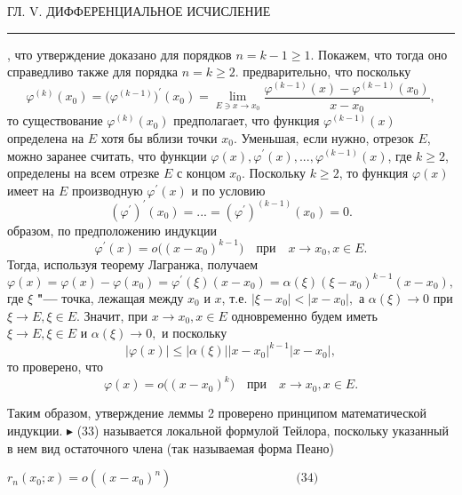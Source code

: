 \documentclass[a5paper, 16pt]{book}
\date{26.02.2023}
\author{Олег Концебалов}
\begin{document}
    \begin{center}
        \begin{spacing}
            ГЛ. V. ДИФФЕРЕНЦИАЛЬНОЕ ИСЧИСЛЕНИЕ
            \noindent\rule{\textwidth}{1pt}
		\end{spacing}
    \end{center}
    , что утверждение доказано для порядков $n = k - 1 \geq 1$. Покажем, что тогда оно справедливо также для порядка $n = k \geq 2$.
     предварительно, что поскольку 
    $$\varphi^{(k)} (x_0) = \bigg(\varphi^{(k - 1)}\bigg)^{'} (x_0) = \lim_{E \ni x\to x_0} \frac{\varphi^{(k - 1)} (x) - \varphi^{(k - 1)} (x_0)}{x - x_0} ,$$
    то существование $\varphi^{(k)} (x_0)$ предполагает, что функция $\varphi^{(k - 1)} (x)$ определена на $E$ хотя бы вблизи точки $x_0$. Уменьшая, если нужно, отрезок $E$, можно заранее считать, что функции $\varphi (x) , \varphi^{'} (x) , . . . , \varphi^{(k - 1)} (x)$, где $k \geq 2$, определены на всем отрезке $E$ с концом $x_0$. Поскольку $k \geq 2$, то функция $\varphi (x)$ имеет на $E$ производную $\varphi^{'} (x)$ и по условию
    $$(\varphi^{'})^{'} (x_0) = . . . = (\varphi^{'})^{(k - 1)} (x_0) = 0.$$
     образом, по предположению индукции
    $$\varphi^{'} (x) = o\bigg((x - x_0)^{k - 1}\bigg) \quad \textrm{при} \quad  x\to x_0 , x\in E.$$
    Тогда, используя теорему Лагранжа, получаем
    $$\varphi (x) = \varphi (x) - \varphi(x_0) = \varphi^{'} (\xi) (x - x_0) = \alpha (\xi) (\xi - x_0)^{k - 1} (x - x_0),$$
    где $\xi$ \textbf{"---} точка, лежащая между $x_0$ и $x$, т.е. $|\xi - x_0| < |x - x_0|,$ а $\alpha (\xi) \to 0$ при $\xi \to E, \xi \in E.$ Значит, при $x \to x_0, x \in E$ одновременно будем иметь $\xi \to E, \xi \in E \textrm{ и } \alpha (\xi) \to 0,$ и поскольку
    $$|\varphi (x)| \leq |\alpha (\xi)| |x - x_0|^{k - 1} |x - x_0|,$$
    то проверено, что 
    $$\varphi (x) = o\bigg((x - x_0)^{k} \bigg) \quad \textrm{при} \quad x \to x_0, x \in E.$$
    \par Таким образом, утверждение леммы 2 проверено принципом математической индукции. $\blacktriangleright$
     (33) называется $\textit{локальной формулой Тейлора}$, поскольку указанный в нем вид остаточного члена (так называемая $\textit{форма Пеано}$)
    \begin{flushright} 
    $r_n (x_0 ; x) = o ((x - x_0)^{n}) \qquad \qquad \qquad \qquad \qquad \textrm{(34)}$ 
    \end{flushright}

    \newpage
 
\end{document}
